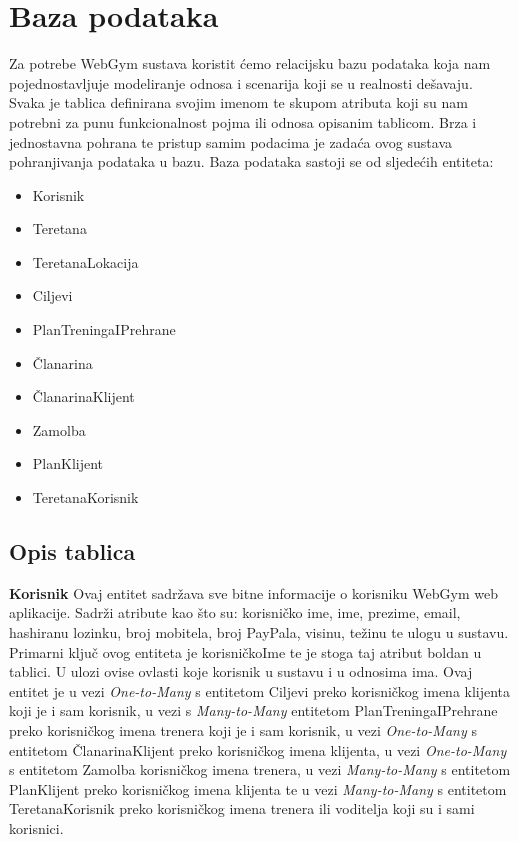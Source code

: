 		\section{Baza podataka}
		Za potrebe WebGym sustava koristit ćemo relacijsku bazu podataka koja nam pojednostavljuje modeliranje odnosa i scenarija koji se u realnosti dešavaju. Svaka je tablica definirana svojim imenom te skupom atributa koji su nam potrebni za punu funkcionalnost pojma ili odnosa opisanim tablicom. Brza i jednostavna pohrana te pristup samim podacima je zadaća ovog sustava pohranjivanja podataka u bazu. Baza podataka sastoji se od sljedećih entiteta:
		\begin{itemize}
	        	\item 	Korisnik
	        	\item 	Teretana 
	        	\item 	TeretanaLokacija 
	        	\item   Ciljevi
	        	\item 	PlanTreningaIPrehrane
	        	\item 	Članarina
	        	\item 	ČlanarinaKlijent
	        	\item 	Zamolba
	        	\item   PlanKlijent
	        	\item   TeretanaKorisnik
        	\end{itemize}
		
		
		\subsection{Opis tablica}
		\textbf{Korisnik} Ovaj entitet sadržava sve bitne informacije o korisniku WebGym web aplikacije. Sadrži atribute kao što su: korisničko ime, ime, prezime, email, hashiranu lozinku, broj mobitela, broj PayPala, visinu, težinu te ulogu u sustavu. Primarni ključ ovog entiteta je korisničkoIme te je stoga taj atribut boldan u tablici. U ulozi ovise ovlasti koje korisnik u sustavu i u odnosima ima. Ovaj entitet je u vezi \emph{One-to-Many} s entitetom Ciljevi preko korisničkog imena klijenta koji je i sam korisnik, u vezi s \emph{Many-to-Many} entitetom PlanTreningaIPrehrane preko korisničkog imena trenera koji je i sam korisnik, u vezi \emph{One-to-Many} s entitetom ČlanarinaKlijent preko korisničkog imena klijenta, u vezi \emph{One-to-Many} s entitetom  Zamolba korisničkog imena trenera, u vezi \emph{Many-to-Many} s entitetom PlanKlijent preko korisničkog imena klijenta te u vezi \emph{Many-to-Many} s entitetom TeretanaKorisnik preko korisničkog imena trenera ili voditelja koji su i sami korisnici.
				
